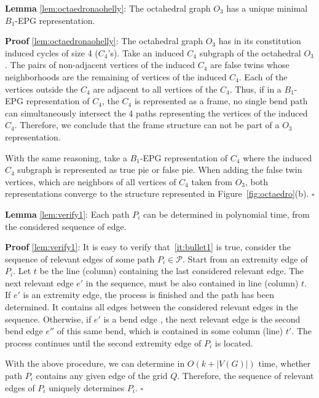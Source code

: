 \documentclass[9pt]{entcs}
\begin{document}
  
 

\begin{lema*}\textbf{Lemma} \ref{lem:octaedronaohelly}:
The octahedral graph $O_3$ has a unique minimal  $ B_1$-EPG representation.%
\end{lema*}

\begin{prove*}\textbf{Proof} \ref{lem:octaedronaohelly}:
The octahedral graph $ O_3 $ has in its constitution induced cycles of size 4 ($ C_4$'s). 
Take an induced $ C_4 $ subgraph  of the octahedral $ O_3 $. The pairs of non-adjacent vertices of the induced $C_4$ are false twins whose neighborhoods are the remaining of vertices of the induced $C_4$. Each of the vertices outside the $C_4$ are adjacent to all vertices of the $C_4$. Thus, if in a $ B_1$-EPG representation of $C_4$, the $ C_4 $ is represented as a frame, no single bend path can simultaneously intersect the 4 paths representing the vertices of the induced $ C_4 $. Therefore, we conclude that the frame structure can not be part of a $ O_3 $ representation.

With the same reasoning, take a $ B_1$-EPG representation of $C_4$ where the induced $ C_4 $ subgraph is represented as true pie or false pie. When adding the false twin vertices, which are neighbors of all vertices of $ C_4 $ taken from $ O_3 $, both representations converge to the structure represented in Figure~\ref{fig:octaedro}(b). 
$\square$ \end{prove*}

%

\begin{lema*}\textbf{Lemma} \ref{lem:verify1}:
Each path $P_i$ can be determined in polynomial time, from the considered sequence of edge.
\end{lema*}

\begin{prove*}\textbf{Proof} \ref{lem:verify1}: 
It is easy to verify that~\ref{it:bullet1} is true, consider the sequence of relevant edges of some path $P_i\in \mathcal{P}$. Start from an extremity edge of $P_i$. Let $t$ be the line (column) containing the last considered relevant edge. The next relevant edge $e'$ in the sequence, must be also contained in line (column) $t$. If $e'$ is an extremity edge, the process is finished and the path has been determined. It contains all edges between the considered relevant edges in the sequence. Otherwise, if $e'$ is a bend edge , the next relevant edge is the second bend edge $e''$ of this same bend, which is contained in some column (line) $t'$. The process continues until the second extremity edge of $P_i$ is located.   

With the above procedure, we can determine in $O(k+|V(G)|)$ time, whether path $P_i$ contains any given edge of the grid $Q$. Therefore, the sequence of relevant edges of $P_i$ uniquely determines $P_i$.
$\square$ \end{prove*}
\end{document}
